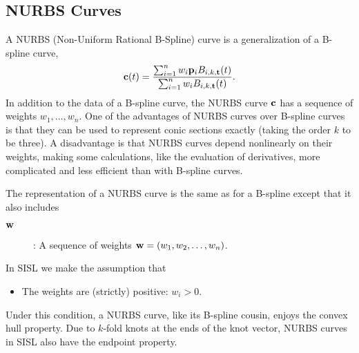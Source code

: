 \subsection{NURBS Curves}

A NURBS (Non-Uniform Rational B-Spline) curve is a generalization
of a B-spline curve,
$$ {\bf c}(t) = {\sum_{i=1}^{n} w_i {\bf p}_{i} B_{i,k,{\bf t}}(t)
                 \over
                 \sum_{i=1}^{n} w_i B_{i,k,{\bf t}}(t)} . $$
In addition to the data of a B-spline curve, the NURBS curve
${\bf c}$ has a sequence of weights $w_1,\ldots,w_n$.
One of the advantages of NURBS curves over B-spline curves is that
they can be used to represent conic sections exactly (taking the
order $k$ to be three).
A disadvantage is that NURBS curves depend nonlinearly on their weights,
making some calculations, like the evaluation of derivatives,
more complicated and less efficient than with B-spline curves.

The representation of a NURBS curve is the same as for a B-spline
except that it also includes
\begin{description}
\item[${\bf w}$]: A sequence of weights
            ${\bf w} = (w_1, w_2, \ldots, w_n)$.
\end{description}

In SISL we make the assumption that
\begin{itemize}
\item The weights are (strictly) positive: $w_i > 0$.
\end{itemize}

Under this condition, a NURBS curve, like its B-spline cousin,
enjoys the convex hull property. 
Due to $k$-fold knots at the ends of the knot vector,
NURBS curves in SISL also have the endpoint property.

